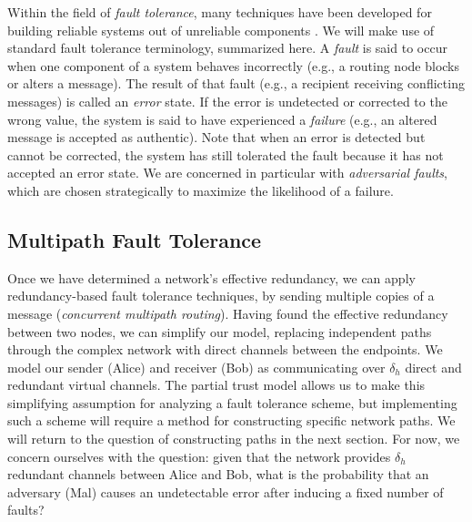 \documentclass[sigconf]{acmart}
\begin{document}
Within the field of {\em fault tolerance},
many techniques have been developed for building reliable systems
out of unreliable components
\cite{avizienis_basic_2004, von_neumann_probabilistic_1956}.
We will make use of standard fault tolerance terminology, summarized here.
A {\em fault} is said to occur when one component
of a system behaves incorrectly (e.g., a routing node blocks or
alters a message).
The result of that fault (e.g., a recipient receiving conflicting messages)
is called an {\em error} state.
If the error is undetected or corrected to the wrong value, the system is
said to have experienced a {\em failure} (e.g., an altered message is
accepted as authentic).
Note that when an error is detected but cannot be corrected,
the system has still tolerated the fault because it has not accepted an error
state.
We are concerned in particular with {\em adversarial faults},
which are chosen strategically to maximize the likelihood of a failure.

\subsection{Multipath Fault Tolerance}

Once we have determined a network's effective redundancy,
we can apply redundancy-based fault tolerance techniques,
by sending multiple copies of a message
({\em concurrent multipath routing}).
Having found the effective redundancy between two nodes,
we can simplify our model, replacing independent paths through the
complex network with direct channels between the endpoints.
We model our sender (Alice) and receiver (Bob) as
communicating over $\delta_h$ direct and redundant virtual channels.
The partial trust model allows us to make this simplifying assumption
for analyzing a fault tolerance scheme,
but implementing such a scheme will require a method for constructing
specific network paths.
We will return to the question of constructing paths in the next section.
For now, we concern ourselves with the question:
given that the network provides $\delta_h$ redundant channels between
Alice and Bob,
what is the probability that an adversary (Mal) causes an undetectable
error after inducing a fixed number of faults?
\end{document}
